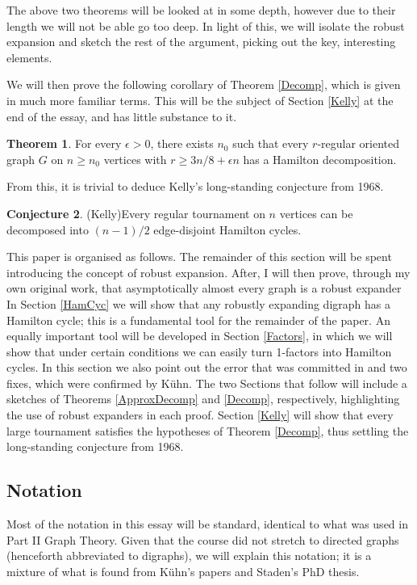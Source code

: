 \documentclass[10pt,letterpaper, reqno]{amsart}
\theoremstyle{definition}
\newtheorem{thm}{Theorem}[section]
\newtheorem{conj}[thm]{Conjecture}
\numberwithin{equation}{section}
\begin{document}
\noindent The above two theorems will be looked at in some depth, however due to their length we will not be able go too deep. In light of this, we will isolate the robust expansion and sketch the rest of the argument, picking out the key, interesting elements. 

We will then prove the following corollary of Theorem \ref{Decomp}, which is given in much more familiar terms. This will be the subject of Section \ref{Kelly} at the end of the essay, and has little substance to it.

\begin{thm}\label{OrientedReg}
	For every $\epsilon >0$, there exists $n_0$ such that every $r$-regular oriented graph $G$ on $n \geq n_0$ vertices with $r \geq 3n/8 + \epsilon n$ has a Hamilton decomposition. 
\end{thm}

\noindent From this, it is trivial to deduce Kelly's long-standing conjecture from 1968. 

\begin{conj}(Kelly)\label{KellyConjecture}
	Every regular tournament on $n$ vertices can be decomposed into $(n-1)/2$ edge-disjoint Hamilton cycles.
\end{conj}


\noindent This paper is organised as follows. The remainder of this section will be spent introducing the concept of robust expansion. After, I will then prove, through my own original work, that asymptotically almost every graph is a robust expander In Section \ref{HamCyc} we will show that any robustly expanding digraph has a Hamilton cycle; this is a fundamental tool for the remainder of the paper. An equally important tool will be developed in Section \ref{Factors}, in which we will show that under certain conditions we can easily turn 1-factors into Hamilton cycles. In this section we also point out the error that was committed in \cite{HamiltonDecomp} and two fixes, which were confirmed by K\"{u}hn. The two Sections that follow will include a sketches of Theorems \ref{ApproxDecomp} and \ref{Decomp}, respectively, highlighting the use of robust expanders in each proof. Section \ref{Kelly} will show that every large tournament satisfies the hypotheses of Theorem \ref{Decomp}, thus settling the long-standing conjecture from 1968. 

\subsection{Notation} Most of the notation in this essay will be standard, identical to what was used in Part II Graph Theory. Given that the course did not stretch to directed graphs (henceforth abbreviated to digraphs), we will explain this notation; it is a mixture of what is found from K\"{u}hn's papers and Staden's PhD thesis. 
\end{document}
